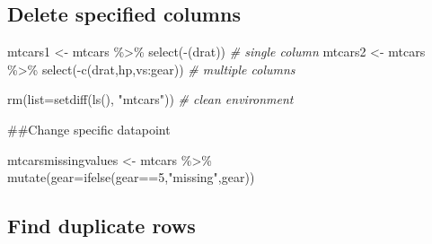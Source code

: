 \documentclass[
]{article}
\newenvironment{Shaded}{\begin{snugshade}}{\end{snugshade}}
\newcommand{\AttributeTok}[1]{\textcolor[rgb]{0.77,0.63,0.00}{#1}}
\newcommand{\CommentTok}[1]{\textcolor[rgb]{0.56,0.35,0.01}{\textit{#1}}}
\newcommand{\DecValTok}[1]{\textcolor[rgb]{0.00,0.00,0.81}{#1}}
\newcommand{\FunctionTok}[1]{\textcolor[rgb]{0.00,0.00,0.00}{#1}}
\newcommand{\NormalTok}[1]{#1}
\newcommand{\OtherTok}[1]{\textcolor[rgb]{0.56,0.35,0.01}{#1}}
\newcommand{\SpecialCharTok}[1]{\textcolor[rgb]{0.00,0.00,0.00}{#1}}
\newcommand{\StringTok}[1]{\textcolor[rgb]{0.31,0.60,0.02}{#1}}
\begin{document}
\hypertarget{delete-specified-columns}{%
\subsection{Delete specified columns}\label{delete-specified-columns}}

\begin{Shaded}
\begin{Highlighting}[]
\NormalTok{mtcars1 }\OtherTok{\textless{}{-}}\NormalTok{ mtcars }\SpecialCharTok{\%\textgreater{}\%} \FunctionTok{select}\NormalTok{(}\SpecialCharTok{{-}}\NormalTok{(drat)) }\CommentTok{\# single column}
\NormalTok{mtcars2 }\OtherTok{\textless{}{-}}\NormalTok{ mtcars }\SpecialCharTok{\%\textgreater{}\%} \FunctionTok{select}\NormalTok{(}\SpecialCharTok{{-}}\FunctionTok{c}\NormalTok{(drat,hp,vs}\SpecialCharTok{:}\NormalTok{gear)) }\CommentTok{\# multiple columns}

\FunctionTok{rm}\NormalTok{(}\AttributeTok{list=}\FunctionTok{setdiff}\NormalTok{(}\FunctionTok{ls}\NormalTok{(), }\StringTok{"mtcars"}\NormalTok{)) }\CommentTok{\# clean environment}
\end{Highlighting}
\end{Shaded}

\#\#Change specific datapoint

\begin{Shaded}
\begin{Highlighting}[]
\NormalTok{mtcarsmissingvalues }\OtherTok{\textless{}{-}}\NormalTok{ mtcars }\SpecialCharTok{\%\textgreater{}\%} \FunctionTok{mutate}\NormalTok{(}\AttributeTok{gear=}\FunctionTok{ifelse}\NormalTok{(gear}\SpecialCharTok{==}\DecValTok{5}\NormalTok{,}\StringTok{"missing"}\NormalTok{,gear))}
\end{Highlighting}
\end{Shaded}

\hypertarget{find-duplicate-rows}{%
\subsection{Find duplicate rows}\label{find-duplicate-rows}}

\begin{Shaded}
\end{Shaded}
\end{document}
